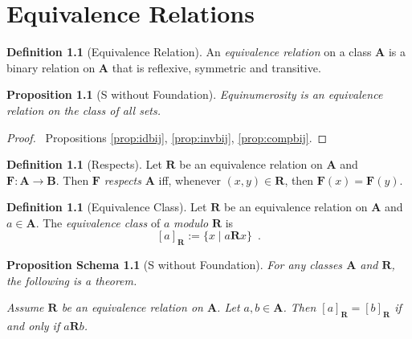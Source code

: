 \documentclass{book}
\let\qed\relax
\newtheorem{prop}[ax]{Proposition}
\newtheorem{props}[ax]{Proposition Schema}
\theoremstyle{definition}
\newtheorem{df}[ax]{Definition}
\begin{document}
\chapter{Equivalence Relations}

\begin{df}[Equivalence Relation]
An \emph{equivalence relation} on a class $\mathbf{A}$ is a binary relation on $\mathbf{A}$ that is reflexive, symmetric and transitive.
\end{df}

\begin{prop}[S without Foundation]
Equinumerosity is an equivalence relation on the class of all sets.
\end{prop}

\begin{proof}
\pf\ Propositions \ref{prop:idbij}, \ref{prop:invbij}, \ref{prop:compbij}. \qed
\end{proof}

\begin{df}[Respects]
Let $\mathbf{R}$ be an equivalence relation on $\mathbf{A}$ and $\mathbf{F} : \mathbf{A} \rightarrow \mathbf{B}$. Then $\mathbf{F}$ \emph{respects} $\mathbf{A}$ iff, whenever $(x,y) \in \mathbf{R}$, then $\mathbf{F}(x) = \mathbf{F}(y)$.
\end{df}

\begin{df}[Equivalence Class]
Let $\mathbf{R}$ be an equivalence relation on $\mathbf{A}$ and $a \in \mathbf{A}$. The \emph{equivalence class} of $a$ \emph{modulo} $\mathbf{R}$ is
\[ [a]_{\mathbf{R}} := \{ x \mid a \mathbf{R} x \} \enspace . \]
\end{df}

\begin{props}[S without Foundation]
\label{prop:eqclassequal}
For any classes $\mathbf{A}$ and $\mathbf{R}$, the following is a theorem.

Assume $\mathbf{R}$ be an equivalence relation on $\mathbf{A}$. Let $a,b \in \mathbf{A}$. Then $[a]_\mathbf{R} = [b]_\mathbf{R}$ if and only if $a \mathbf{R} b$.
\end{props}
\end{document}
